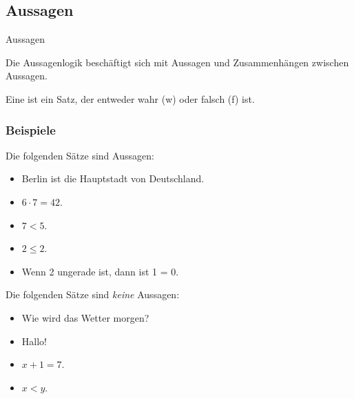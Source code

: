 \subsection{Aussagen}
%
\begin{frame}{Aussagen}
	
	Die Aussagenlogik beschäftigt sich mit Aussagen und Zusammenhängen zwischen Aussagen.\\[5mm]
	
	\begin{definition}
		Eine  ist ein Satz, der entweder wahr (w) oder falsch (f) ist.
	\end{definition}
	
\end{frame}
%
%
\begin{frame}\frametitle{Beispiele}

	Die folgenden Sätze sind Aussagen:
	\begin{itemize}
		\item Berlin ist die Hauptstadt von Deutschland.
		\item $6\cdot 7 = 42$.
		\item $7<5$.
		\item $2\leq 2$.
		\item Wenn 2 ungerade ist, dann ist 1 = 0.
	\end{itemize}
	
	\pause
	\vfill
	Die folgenden Sätze sind {\em keine} Aussagen:
	\begin{itemize}
		\item Wie wird das Wetter morgen?
		\item Hallo!
		\item $x + 1 = 7$.
		\item $x < y$.
	\end{itemize}
	
\end{frame}
%

